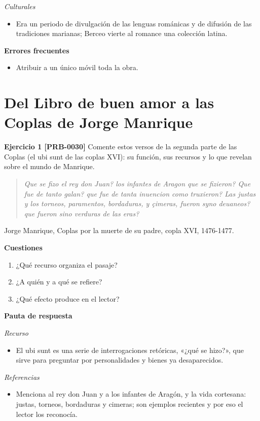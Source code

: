 \documentclass{book}
\begin{document}
\noindent\textit{Culturales}
\begin{itemize}
\item Era un periodo de divulgación de las lenguas románicas y de difusión de las tradiciones marianas; Berceo vierte al romance una colección latina.
\end{itemize}

\noindent\textbf{Errores frecuentes}
\begin{itemize}
\item Atribuir a un único móvil toda la obra.
\end{itemize}

\section{Del Libro de buen amor a las Coplas de Jorge Manrique}

\noindent\textbf{Ejercicio 1 [PRB-0030]}
Comente estos versos de la segunda parte de las Coplas (el ubi sunt de las coplas XVI): su función, sus recursos y lo que revelan sobre el mundo de Manrique.


\begin{quote}
\itshape Que se fizo el rey don Juan? los infantes de Aragon que se fizieron? Que fue de tanto galan? que fue de tanta inuencion como truxieron? Las justas y los torneos, paramentos, bordaduras, y çimeras, fueron syno deuaneos? que fueron sino verduras de las eras?
\end{quote}
{\noindent\footnotesize Jorge Manrique, Coplas por la muerte de su padre, copla XVI, 1476-1477.\par}

\noindent\textbf{Cuestiones}
\begin{enumerate}
\item ¿Qué recurso organiza el pasaje?
\item ¿A quién y a qué se refiere?
\item ¿Qué efecto produce en el lector?
\end{enumerate}

\noindent\textbf{Pauta de respuesta}

\noindent\textit{Recurso}
\begin{itemize}
\item El ubi sunt es una serie de interrogaciones retóricas, «¿qué se hizo?», que sirve para preguntar por personalidades y bienes ya desaparecidos.
\end{itemize}

\noindent\textit{Referencias}
\begin{itemize}
\item Menciona al rey don Juan y a los infantes de Aragón, y la vida cortesana: justas, torneos, bordaduras y cimeras; son ejemplos recientes y por eso el lector los reconocía.
\end{itemize}
\end{document}

